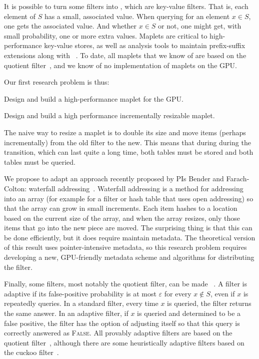 
It is possible to turn some filters into , which are key-value filters.  That is, each element of $S$ has a small, associated value.  When querying for an element $x\in S$, one gets the associated value.  And whether $x\in S$ or not, one might get, with small probability, one or more extra values.  Maplets are critical to high-performance key-value stores, as well as \kmer analysis tools to maintain prefix-suffix extensions along with \kmers~\cite{mccoy2022high}.  To date, all maplets that we know of are based on the quotient filter~\cite{conway2020splinterdb,mccoy2022high}, and we know of no implementation of maplets on the GPU\@.

Our first research problem is thus:

\begin{rproblem}
Design and build a high-performance maplet for the GPU\@.
\end{rproblem}


\begin{rproblem}\label{rprob:resizable-maplet}
Design and build a high performance incrementally resizable maplet.
\end{rproblem}
The naive way to resize a maplet is to double its size and move items (perhaps incrementally) from the old filter to the new.  This means that during during the transition, which can last quite a long time, both tables must be stored and both tables must be queried.

We propose to adapt an approach recently proposed by PIs Bender and Farach-Colton: waterfall addressing~\cite{all-purpose-hashing}.   Waterfall addressing is a method for addressing into an array (for example for a filter or hash table that uses open addressing) so that the array can grow in small increments.  Each item hashes to a location based on the current size of the array, and when the array resizes, only those items that go into the new piece are moved.  The surprising thing is that this can be done efficiently, but it does require maintain metadata.  The theoretical version of this result uses pointer-intensive metadata, so this research problem requires developing a new, GPU-friendly metadata scheme and algorithms for distributing the filter.

Finally, some filters, most notably the quotient filter, can be made ~\cite{BenderFaGo18}.  A filter is adaptive if its false-positive probability is at most $\varepsilon$ for every $x\notin S$, even if $x$ is repeatedly queries.  In a standard filter, every time $x$ is queried, the filter returns the same answer.  In an adaptive filter, if $x$ is queried and determined to be a false positive, the filter has the option of adjusting itself so that this query is correctly answered as \textsc{False}.  All provably adaptive filters are based on the quotient filter~\cite{BenderFaGo18,Lee21}, although there are some heuristically adaptive filters based on the cuckoo filter~\cite{Mitzenmacher2020}. 

